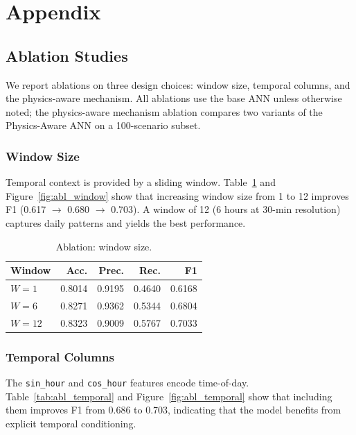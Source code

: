 \documentclass[final,5p,times,twocolumn,authoryear]{elsarticle}
\begin{document}
\section{Appendix}

\subsection{Ablation Studies}

We report ablations on three design choices: window size, temporal columns, and the physics-aware mechanism. All ablations use the base ANN unless otherwise noted; the physics-aware mechanism ablation compares two variants of the Physics-Aware ANN on a 100-scenario subset.

\subsubsection{Window Size}

Temporal context is provided by a sliding window. Table~\ref{tab:abl_window} and Figure~\ref{fig:abl_window} show that increasing window size from 1 to 12 improves F1 (0.617 $\rightarrow$ 0.680 $\rightarrow$ 0.703). A window of 12 (6 hours at 30-min resolution) captures daily patterns and yields the best performance.

\begin{table}[H]
\centering
\caption{Ablation: window size.}
\label{tab:abl_window}
\small
\begin{tabular}{@{}lrrrr@{}}
\toprule
\textbf{Window} & \textbf{Acc.} & \textbf{Prec.} & \textbf{Rec.} & \textbf{F1} \\ \midrule
$W=1$  & 0.8014 & 0.9195 & 0.4640 & 0.6168 \\
$W=6$  & 0.8271 & 0.9362 & 0.5344 & 0.6804 \\
$W=12$ & 0.8323 & 0.9009 & 0.5767 & 0.7033 \\ \bottomrule
\end{tabular}
\end{table}

\subsubsection{Temporal Columns}

The \texttt{sin\_hour} and \texttt{cos\_hour} features encode time-of-day. Table~\ref{tab:abl_temporal} and Figure~\ref{fig:abl_temporal} show that including them improves F1 from 0.686 to 0.703, indicating that the model benefits from explicit temporal conditioning.
\end{document}
